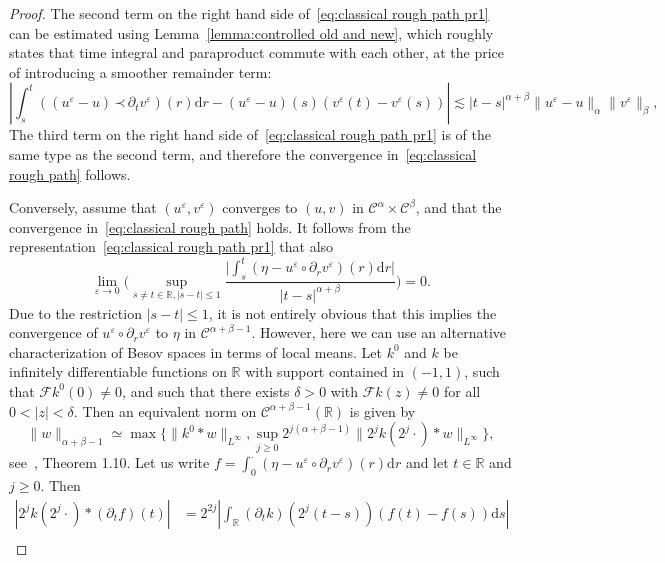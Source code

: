 \documentclass[a4paper,11pt]{article}
\newcommand{\cdummy}{\cdot}
\newcommand{\mathd}{\mathrm{d}}
\theoremstyle{remark}
\newcommand{\CC}{\ensuremath{\mathscr{C}}}
\newcommand{\lpara}{\,\mathord{\prec}\,}
\newcommand{\reso}{\,\mathord{\circ}\,}
\begin{document}
\begin{proof}
  The second term on the right hand side of~{\eqref{eq:classical rough path pr1}} can be estimated using Lemma~\ref{lemma:controlled old and new}, which roughly states that time integral and paraproduct commute with each other, at the price of introducing a smoother remainder term:
  \[
     \left| \int_{s}^{t} ( ( u^{\varepsilon} -u ) \lpara \partial_{t} v^{\varepsilon} ) ( r ) \mathd r- ( u^{\varepsilon} -u ) ( s ) ( v^{\varepsilon} ( t ) -v^{\varepsilon} ( s ) ) \right| \lesssim | t-s |^{\alpha + \beta} \| u^{\varepsilon} -u \|_{\alpha} \| v^{\varepsilon} \|_{\beta},
  \]
  The third term on the right hand side of~{\eqref{eq:classical rough path pr1}} is of the same type as the second term, and therefore the convergence
  in~{\eqref{eq:classical rough path}} follows.
  
  Conversely, assume that $( u^{\varepsilon} ,v^{\varepsilon} )$ converges to
  $( u,v )$ in $\CC^{\alpha} \times \CC^\beta$, and that the
  convergence in~{\eqref{eq:classical rough path}} holds. It follows from the
  representation~{\eqref{eq:classical rough path pr1}} that also
  \[
     \lim_{\varepsilon \rightarrow 0} \Bigg( \sup_{s \neq t \in \mathbb{R}, | s-t | \leqslant 1} \frac{\big| \int_{s}^{t} ( \eta -u^{\varepsilon} \reso \partial_{r} v^{\varepsilon} ) ( r ) \mathd r \big|}{| t-s |^{\alpha + \beta}} \Bigg) =0.
  \]
  Due to the restriction $| s-t | \leqslant 1$, it is not entirely obvious
  that this implies the convergence of $u^{\varepsilon} \reso \partial_{r} v^{\varepsilon}$ to $\eta$ in $\CC^{\alpha + \beta -1}$. However, here
  we can use an alternative characterization of Besov spaces in terms of
  local means. Let $k^{0}$ and $k$ be infinitely differentiable functions on
  $\mathbb{R}$ with support contained in $( -1,1 )$, such that $\mathcal{F}k^{0} (0 ) \neq 0$, and such that there exists $\delta >0$ with $\mathcal{F}k ( z ) \neq 0$ for all $0< | z | < \delta$. Then an equivalent norm on $\CC^{\alpha + \beta -1} ( \mathbb{R} )$ is given by
  \[
     \| w \|_{\alpha + \beta -1} \simeq \max \Big\{ \| k^{0} \ast w \|_{L^{\infty}} , \sup_{j \geqslant 0}  2^{j ( \alpha + \beta -1 )} \| 2^{j} k ( 2^{j}  \cdummy ) \ast w \|_{L^{\infty}} \Big\} ,
  \]
  see~\cite{Triebel2006}, Theorem 1.10. Let us write $f= \int_{0}^{\cdummy} (\eta -u^{\varepsilon} \reso \partial_{r} v^{\varepsilon} ) ( r ) \mathd r$
  and let $t \in \mathbb{R}$ and $j \geqslant 0$. Then
  \begin{align*}
     | 2^{j} k ( 2^{j} \cdummy ) \ast (\partial_t f) ( t ) | & = 2^{2j} \left| \int_{\mathbb{R}} (\partial_{t} k) (2^j (t-s) ) ( f ( t ) -f ( s ) ) \mathd s \right| \\

\end{align*}
\end{proof}
\end{document}
